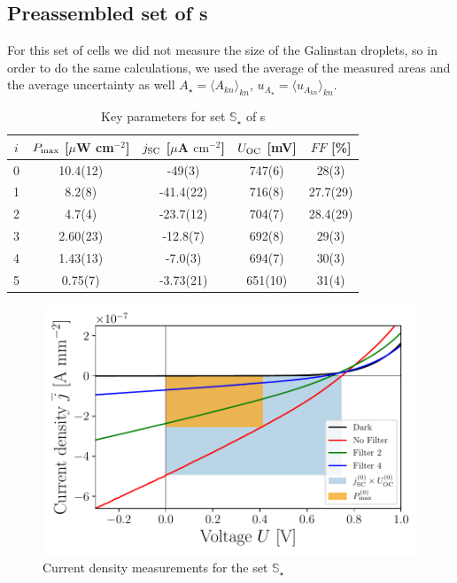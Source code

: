 \subsection{Preassembled set of \BHSC s}

For this set of cells we did not measure the size of the Galinstan droplets, so in order to do the same calculations, we used the average of the measured areas and the average uncertainty as well $A_\star = \langle A_{kn} \rangle_{kn}$, $u_{A_\star} = \langle u_{A_{kn}}  \rangle_{kn}$.

\begin{table}[h]\centering
\caption{Key parameters for set $\mathbb{S}_\star$ of \BHSC s}
\label{tab:keyparamsstar}
\begin{tabular}{@{}ccccc@{}}\toprule
$i$ & $P_{\text{max}}$ [$\mu$W cm$^{-2}$] & $j_{\text{SC}}$ [$\mu$A $\mathrm{cm}^{-2}$] & $U_{\text{OC}}$ [mV] & $FF$ [\%]\\\midrule
0 &   10.4(12)  &  -49(3)  & 747(6) & 28(3) \\
1 &   8.2(8)  &  -41.4(22)  & 716(8) & 27.7(29) \\
2 &   4.7(4)  &  -23.7(12)  & 704(7) & 28.4(29) \\
3 &   2.60(23)  &  -12.8(7)  & 692(8) & 29(3) \\
4 &   1.43(13)  &  -7.0(3)  & 694(7) & 30(3)\\
5 &  0.75(7)  &  -3.73(21)  & 651(10) & 31(4) \\\bottomrule
\end{tabular}
\end{table}

\begin{figure}[H]\centering
\includegraphics[width=\columnwidth]{../../../IV-Curve-Analysis/OSCPGraph.pdf}
\caption{Current density measurements for the set $\mathbb{S}_\star$}
\label{fig:OSCstarGraph}
\end{figure}

